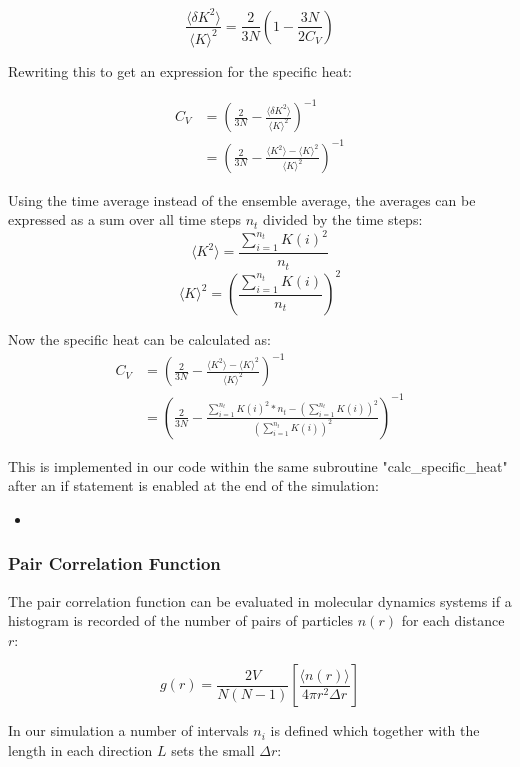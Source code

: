 \documentclass[
10pt, %
a4paper, %
oneside, %
headinclude,footinclude, %
BCOR5mm, %
]{scrartcl}
\newcommand{\insertcode}[2]{\begin{itemize}\item[]\end{itemize}} %
\begin{document}
$$ \frac{\langle\delta K^2\rangle}{\langle K\rangle^2} = \frac{2}{3N} \left ( 1 - \frac{3N}{2C_V} \right ) $$

\noindent
Rewriting this to get an expression for the specific heat:

\begin{align}
C_V &= \left (\frac{2}{3N} - \frac{\langle\delta K^2\rangle}{\langle K\rangle^2}\right)^{-1} \\
&= \left (\frac{2}{3N} - \frac{\langle K^2 \rangle - \langle K \rangle^2}{\langle K\rangle^2} \right )^{-1} 
\end{align}


\noindent
Using the time average instead of the ensemble average, the averages can be expressed as a sum over all time steps $n_t$ divided by the time steps:
$$ \langle K^2 \rangle  = \frac{\sum_{i=1}^{n_t} K(i)^2}{n_t} $$
$$ \langle K \rangle^2  = \left ( \frac{\sum_{i=1}^{n_t} K(i)  }{n_t} \right)^2 $$

\noindent
Now the specific heat can be calculated as:
\begin{align}
C_V &= \left (\frac{2}{3N} - \frac{\langle K^2 \rangle - \langle K \rangle^2}{\langle K\rangle^2} \right )^{-1} \\
&= \left ( \frac{2}{3N} - \frac{\sum_{i=1}^{n_t} K(i)^2*n_t - \left (\sum_{i=1}^{n_t} K(i) \right )^2 }{\left (\sum_{i=1}^{n_t} K(i) \right )^2 } \right )^{-1}
\end{align}

This is implemented in our code within the same subroutine "calc\_specific\_heat" after an if statement is enabled at the end of the simulation:
\insertcode{"Scripts/specific_heat_snippet_2.f90"}{Calculating the specific heat} %


\subsubsection{Pair Correlation Function}

The pair correlation function can be evaluated in molecular dynamics systems  if a histogram is recorded of the number of pairs of particles $n(r)$ for each distance $r$:

$$ g(r) = \frac{2V}{N(N-1)} \left [ \frac{\langle n(r) \rangle }{ 4 \pi r^2 \Delta r} \right ] $$

\noindent
In our simulation a number of intervals $n_i$ is defined which together with the length in each direction $L$ sets the small $\Delta r$:
\end{document}
